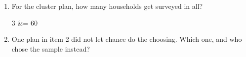 \documentclass[10pt]{article}
\begin{document}
\begin{tcolorbox}[colback=white, colframe=black!40, breakable,
    title=\textbf{Tier R --- Remediate},
    fonttitle=\bfseries, arc=2mm, left=3mm, right=3mm, top=2mm, bottom=2mm]
\begin{enumerate}[leftmargin=1.6em, itemsep=6pt, topsep=4pt]
        \blank{2cm} \qquad \blank{2cm} \qquad \blank{2cm}

  \item For the cluster plan, how many households get surveyed in all?

        \begin{work}
          3  &= 60 
        \end{work}

  \item One plan in item 2 did not let chance do the choosing. Which one, and who
        chose the sample instead?
        \writeline
\end{enumerate}
\end{tcolorbox}

\vspace{0.1in}
\end{document}
